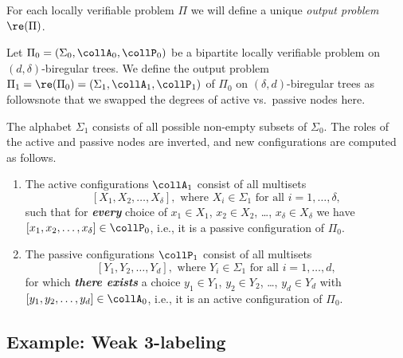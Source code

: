 For each locally verifiable problem $\Pi$ we will define a unique \emph{output problem} $\re(\Pi)$.

Let $\Pi_0 = (\Sigma_0, \collA_0, \collP_0)$ be a bipartite locally verifiable problem on $(d,\delta)$-biregular trees. We define the output problem $\Pi_1 = \re(\Pi_0) = (\Sigma_1, \collA_1, \collP_1)$ of $\Pi_0$ on $(\delta,d)$-biregular trees as follows\mydash note that we swapped the degrees of active vs.\ passive nodes here.

The alphabet $\Sigma_1$ consists of all possible non-empty subsets of $\Sigma_0$. The roles of the active and passive nodes are inverted, and new configurations are computed as follows.
\begin{enumerate}
	\item The active configurations $\collA_1$ consist of all multisets
	\[
	[ X_1, X_2, \dotsc, X_{\delta} ], \text{ where } X_i \in \Sigma_1 \text{ for all } i = 1,\dotsc,\delta,
	\] 
	such that for \textbf{\emph{every}} choice of $x_1 \in X_1$, $x_2 \in X_2$, \ldots, $x_{\delta} \in X_{\delta}$ we have $[x_1, x_2, \dotsc, x_{\delta}] \in \collP_0$, i.e., it is a passive configuration of $\Pi_0$.
	\item The passive configurations $\collP_1$ consist of all multisets
	\[
	[ Y_1,  Y_2, \dotsc, Y_d ], \text{ where } Y_i \in \Sigma_1 \text{ for all } i = 1,\dotsc,d,
	\]
	for which \textbf{\emph{there exists}} a choice $y_1 \in Y_1$, $y_2 \in Y_2$, \ldots, $y_d \in Y_d$ with $[ y_1, y_2, \dotsc, y_d] \in \collA_0$, i.e., it is an active configuration of $\Pi_0$.
\end{enumerate}

\subsection{Example: Weak 3-labeling} \label{ssec:example-w3ec}


